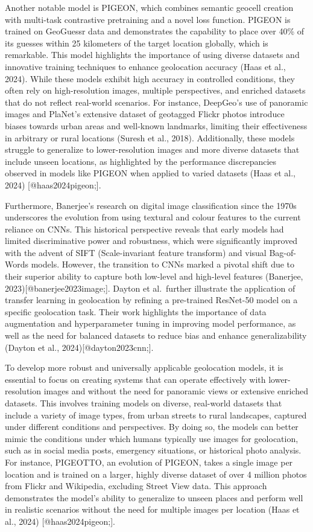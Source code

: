 \documentclass{article}
\begin{document}
Another notable model is PIGEON, which combines semantic geocell
creation with multi-task contrastive pretraining and a novel loss
function. PIGEON is trained on GeoGuessr data and demonstrates the
capability to place over 40\% of its guesses within 25 kilometers of the
target location globally, which is remarkable. This model highlights the
importance of using diverse datasets and innovative training techniques
to enhance geolocation accuracy (Haas et al., 2024). While these models
exhibit high accuracy in controlled conditions, they often rely on
high-resolution images, multiple perspectives, and enriched datasets
that do not reflect real-world scenarios. For instance, DeepGeo's use of
panoramic images and PlaNet's extensive dataset of geotagged Flickr
photos introduce biases towards urban areas and well-known landmarks,
limiting their effectiveness in arbitrary or rural locations (Suresh et
al., 2018). Additionally, these models struggle to generalize to
lower-resolution images and more diverse datasets that include unseen
locations, as highlighted by the performance discrepancies observed in
models like PIGEON when applied to varied datasets (Haas et al., 2024)
{[}@haas2024pigeon;{]}.

Furthermore, Banerjee's research on digital image classification since
the 1970s underscores the evolution from using textural and colour
features to the current reliance on CNNs. This historical perspective
reveals that early models had limited discriminative power and
robustness, which were significantly improved with the advent of SIFT
(Scale-invariant feature transform) and visual Bag-of-Words models.
However, the transition to CNNs marked a pivotal shift due to their
superior ability to capture both low-level and high-level features
(Banerjee, 2023){[}@banerjee2023image;{]}. Dayton et al.~further
illustrate the application of transfer learning in geolocation by
refining a pre-trained ResNet-50 model on a specific geolocation task.
Their work highlights the importance of data augmentation and
hyperparameter tuning in improving model performance, as well as the
need for balanced datasets to reduce bias and enhance generalizability
(Dayton et al., 2024){[}@dayton2023cnn;{]}.

To develop more robust and universally applicable geolocation models, it
is essential to focus on creating systems that can operate effectively
with lower-resolution images and without the need for panoramic views or
extensive enriched datasets. This involves training models on diverse,
real-world datasets that include a variety of image types, from urban
streets to rural landscapes, captured under different conditions and
perspectives. By doing so, the models can better mimic the conditions
under which humans typically use images for geolocation, such as in
social media posts, emergency situations, or historical photo analysis.
For instance, PIGEOTTO, an evolution of PIGEON, takes a single image per
location and is trained on a larger, highly diverse dataset of over 4
million photos from Flickr and Wikipedia, excluding Street View data.
This approach demonstrates the model's ability to generalize to unseen
places and perform well in realistic scenarios without the need for
multiple images per location (Haas et al., 2024) {[}@haas2024pigeon;{]}.
\end{document}
